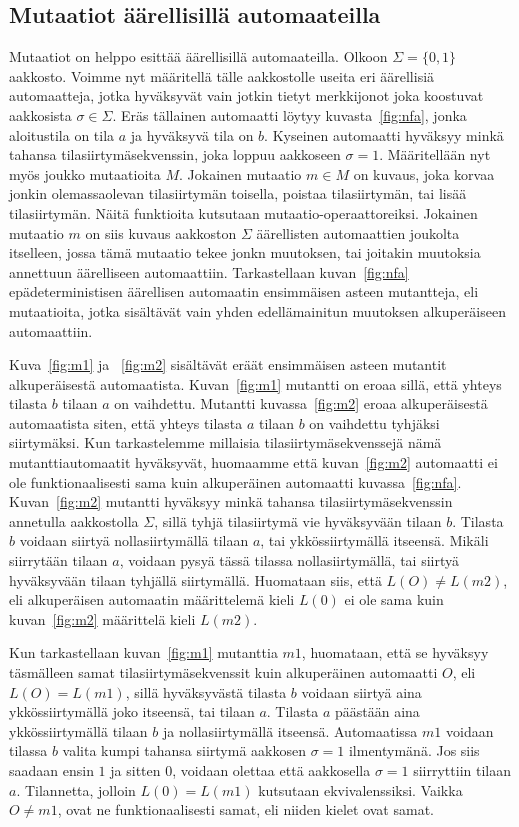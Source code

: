 \documentclass{tktltiki}
\begin{document}
\subsection{Mutaatiot äärellisillä automaateilla}
Mutaatiot on helppo esittää äärellisillä automaateilla. Olkoon $\Sigma=\{0,1\}$ aakkosto. Voimme nyt määritellä tälle aakkostolle useita eri äärellisiä automaatteja, jotka hyväksyvät vain jotkin tietyt merkkijonot joka koostuvat aakkosista $\sigma \in \Sigma$. Eräs tällainen automaatti löytyy kuvasta~\ref{fig:nfa}, jonka aloitustila on tila $a$ ja hyväksyvä tila on $b$. Kyseinen automaatti hyväksyy minkä tahansa tilasiirtymäsekvenssin, joka loppuu aakkoseen $\sigma = 1$. Määritellään nyt myös joukko mutaatioita $M$. Jokainen mutaatio $m\in M$ on kuvaus, joka korvaa jonkin olemassaolevan tilasiirtymän toisella, poistaa tilasiirtymän, tai lisää tilasiirtymän. Näitä funktioita kutsutaan mutaatio-operaattoreiksi. Jokainen mutaatio $m$ on siis kuvaus aakkoston $\Sigma$ äärellisten automaattien joukolta itselleen, jossa tämä mutaatio tekee jonkn muutoksen, tai joitakin muutoksia annettuun äärelliseen automaattiin. Tarkastellaan kuvan~\ref{fig:nfa} epädeterministisen äärellisen automaatin ensimmäisen asteen mutantteja, eli mutaatioita, jotka sisältävät vain yhden edellämainitun muutoksen alkuperäiseen automaattiin. 

Kuva~\ref{fig:m1} ja ~\ref{fig:m2} sisältävät eräät ensimmäisen asteen mutantit alkuperäisestä automaatista. Kuvan~\ref{fig:m1} mutantti on eroaa sillä, että yhteys tilasta $b$ tilaan $a$ on vaihdettu. Mutantti kuvassa~\ref{fig:m2} eroaa alkuperäisestä automaatista siten, että yhteys tilasta $a$ tilaan $b$ on vaihdettu tyhjäksi siirtymäksi. Kun tarkastelemme millaisia tilasiirtymäsekvenssejä nämä mutanttiautomaatit hyväksyvät, huomaamme että kuvan~\ref{fig:m2} automaatti ei ole funktionaalisesti sama kuin alkuperäinen automaatti kuvassa~\ref{fig:nfa}. Kuvan~\ref{fig:m2} mutantti hyväksyy minkä tahansa tilasiirtymäsekvenssin annetulla aakkostolla $\Sigma$, sillä tyhjä tilasiirtymä vie hyväksyvään tilaan $b$. Tilasta $b$ voidaan siirtyä nollasiirtymällä tilaan $a$, tai ykkössiirtymällä itseensä. Mikäli siirrytään tilaan $a$, voidaan pysyä tässä tilassa nollasiirtymällä, tai siirtyä hyväksyvään tilaan tyhjällä siirtymällä. Huomataan siis, että $L(O) \neq L(m2)$, eli alkuperäisen automaatin määrittelemä kieli $L(0)$ ei ole sama kuin kuvan~\ref{fig:m2} määrittelä kieli $L(m2)$.

Kun tarkastellaan kuvan~\ref{fig:m1} mutanttia $m1$, huomataan, että se hyväksyy täsmälleen samat tilasiirtymäsekvenssit kuin alkuperäinen automaatti $O$, eli $L(O) = L(m1)$, sillä hyväksyvästä tilasta $b$ voidaan siirtyä aina ykkössiirtymällä joko itseensä, tai tilaan $a$. Tilasta $a$ päästään aina ykkössiirtymällä tilaan $b$ ja nollasiirtymällä itseensä. Automaatissa $m1$ voidaan tilassa $b$ valita kumpi tahansa siirtymä aakkosen $\sigma = 1$ ilmentymänä. Jos siis saadaan ensin $1$ ja sitten $0$, voidaan olettaa että aakkosella $\sigma = 1$ siirryttiin tilaan $a$. Tilannetta, jolloin $L(0) = L(m1)$ kutsutaan ekvivalenssiksi. Vaikka $O \neq m1$, ovat ne funktionaalisesti samat, eli niiden kielet ovat samat. 
 
\end{document}
